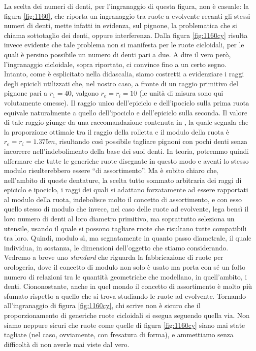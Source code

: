 \noindent La scelta dei numeri di denti, per l'ingranaggio di questa figura,
non \`e casuale: la figura
\ref{fig:1160}, che riporta un ingranaggio tra ruote a evolvente
recanti gli stessi numeri di denti, mette infatti in evidenza, sul pignone,
la problematica che si chiama sottotaglio dei denti, oppure
interferenza. Dalla figura \ref{fig:1160cy} risulta invece evidente che tale
problema non si manifesta per le ruote cicloidali, per le quali \`e
persino possibile un numero di denti pari a due.
A dire il vero per\`o, l'ingranaggio cicloidale, sopra riportato, ci convince
fino a un certo segno. Intanto, come \`e esplicitato nella didascalia,
siamo costretti a evidenziare i raggi degli epicicli utilizzati che, nel nostro
caso, a fronte di un raggio primitivo del pignone pari a $r_1=40$,
valgono $r_e=r_i=10$ (le unit\`a di misura sono qui volutamente omesse).
Il raggio unico dell'epiciclo e dell'ipociclo sulla
prima ruota equivale naturalmente a quello dell'ipociclo e dell'epiciclo
sulla seconda. Il valore di tale raggio giunge da una raccomandazione
contenuta in \cite{punzi}, la quale segnala che la proporzione ottimale tra
il raggio della rolletta e il modulo della ruota \`e $r_e=r_i=1.375 m$,
risultando cos\`i possibile
tagliare pignoni con pochi denti senza incorrere nell'indebolimento della
base dei suoi denti. In teoria, potremmo quindi affermare che tutte
 le generiche ruote disegnate in questo modo e
 aventi lo stesso modulo risulterebbero essere
``di assortimento''. Ma \`e subito chiaro che, nell'ambito di queste
dentature, la scelta
tutto sommato arbitraria dei raggi di epiciclo e ipociclo, i raggi
dei quali si adattano forzatamente ad essere rapportati al modulo della ruota,
indebolisce molto il concetto di assortimento, e con esso quello stesso
di modulo che invece, nel caso delle ruote ad evolvente, lega bens\`i il
loro numero di denti al loro diametro primitivo, ma soprattutto 
seleziona
un utensile, usando il quale si possono tagliare
ruote che risultano tutte compatibili tra loro. Quindi, modulo s\`i, ma segnatamente
in quanto passo diametrale, il quale individua, in sostanza, le dimensioni
dell'oggetto che stiamo considerando. Vedremo a breve uno {\em standard}
che riguarda la fabbricazione di ruote per orologeria, dove il concetto
di modulo non solo \`e usato ma porta con s\'e un folto numero di
relazioni tra le quantit\`a geometriche che modellano, in quell'ambito,
i denti. Ciononostante, anche in quel mondo il concetto di assortimento
\`e molto pi\`u sfumato rispetto a quello che si trova studiando le ruote ad
evolvente. Tornando all'ingranaggio di figura \ref{fig:1160cy}, chi scrive 
non \`e sicuro che il  proporzionamento di generiche ruote cicloidali si esegua
seguendo quella via. Non siamo neppure sicuri che ruote come quelle
di figura \ref{fig:1160cy} siano mai state tagliate (nel caso, ovviamente,
con fresatura di forma), e ammettiamo senza difficolt\`a  di non
averle mai viste dal vero.



